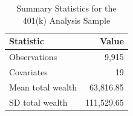 \begin{table}[!htbp]
\centering
\caption{Summary Statistics for the 401(k) Analysis Sample}
\label{tab:data-summary}
\begin{tabular}{lr}
\hline
Statistic & Value \\
\hline
Observations & 9,915 \\
Covariates & 19 \\
Mean total wealth & 63,816.85 \\
SD total wealth & 111,529.65 \\
\hline
\end{tabular}
\end{table}
